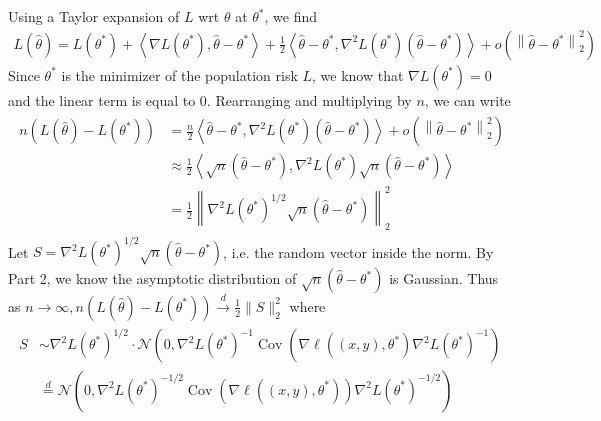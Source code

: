 \documentclass{article}
\begin{document}
Using a Taylor expansion of $L$ \gls{wrt} $\theta$ at $\theta^{*}$, we find
\begin{align*}
L(\hat{\theta})=L\left(\theta^{*}\right)+\left\langle\nabla L\left(\theta^{*}\right), \hat{\theta}-\theta^{*}\right\rangle+\frac{1}{2}\left\langle\hat{\theta}-\theta^{*}, \nabla^{2} L\left(\theta^{*}\right)\left(\hat{\theta}-\theta^{*}\right)\right\rangle+o\left(\left\|\hat{\theta}-\theta^{*}\right\|_{2}^{2}\right)
\end{align*}
Since $\theta^{*}$ is the minimizer of the population risk $L$, we know that $\nabla L\left(\theta^{*}\right)=0$ and the linear term is equal to 0. Rearranging and multiplying by $n$, we can write
\begin{align*}
\begin{aligned}
n\left(L(\hat{\theta})-L\left(\theta^{*}\right)\right) &=\frac{n}{2}\left\langle\hat{\theta}-\theta^{*}, \nabla^{2} L\left(\theta^{*}\right)\left(\hat{\theta}-\theta^{*}\right)\right\rangle+o\left(\left\|\hat{\theta}-\theta^{*}\right\|_{2}^{2}\right) \\
& \approx \frac{1}{2}\left\langle\sqrt{n}\left(\hat{\theta}-\theta^{*}\right), \nabla^{2} L\left(\theta^{*}\right) \sqrt{n}\left(\hat{\theta}-\theta^{*}\right)\right\rangle \\
&=\frac{1}{2}\left\|\nabla^{2} L\left(\theta^{*}\right)^{1 / 2} \sqrt{n}\left(\hat{\theta}-\theta^{*}\right)\right\|_{2}^{2}
\end{aligned}
\end{align*}
Let $S=\nabla^{2} L\left(\theta^{*}\right)^{1 / 2} \sqrt{n}\left(\hat{\theta}-\theta^{*}\right)$, i.e. the random vector inside the norm. By Part 2, we know the asymptotic distribution of $\sqrt{n}\left(\hat{\theta}-\theta^{*}\right)$ is Gaussian. Thus as $n \rightarrow \infty, n\left(L(\hat{\theta})-L\left(\theta^{*}\right)\right) \stackrel{d}{\rightarrow} \frac{1}{2}\|S\|_{2}^{2}$ where
\begin{align*}
\begin{aligned}
S & \sim \nabla^{2} L\left(\theta^{*}\right)^{1 / 2} \cdot \mathcal{N}\left(0, \nabla^{2} L\left(\theta^{*}\right)^{-1} \operatorname{Cov}\left(\nabla \ell\left((x, y), \theta^{*}\right) \nabla^{2} L\left(\theta^{*}\right)^{-1}\right)\right.\\
& \stackrel{d}{=} \mathcal{N}\left(0, \nabla^{2} L\left(\theta^{*}\right)^{-1 / 2} \operatorname{Cov}\left(\nabla \ell\left((x, y), \theta^{*}\right)\right) \nabla^{2} L\left(\theta^{*}\right)^{-1 / 2}\right)
\end{aligned}
\end{align*}
\end{document}
